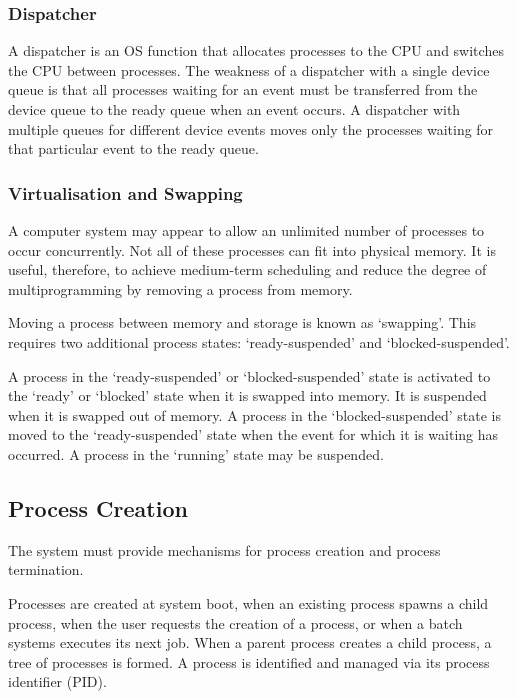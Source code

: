 \subsubsection{Dispatcher}

A dispatcher is an OS function that allocates processes to the CPU and switches the CPU between processes.
The weakness of a dispatcher with a single device queue is that all processes waiting for an event must be transferred from the device queue to the ready queue when an event occurs.
A dispatcher with multiple queues for different device events moves only the processes waiting for that particular event to the ready queue.

\subsubsection{Virtualisation and Swapping}

A computer system may appear to allow an unlimited number of processes to occur concurrently.
Not all of these processes can fit into physical memory.
It is useful, therefore, to achieve medium-term scheduling and reduce the degree of multiprogramming by removing a process from memory.

Moving a process between memory and storage is known as `swapping'.
This requires two additional process states: `ready-suspended' and `blocked-suspended'.

A process in the `ready-suspended' or `blocked-suspended' state is activated to the `ready' or `blocked' state when it is swapped into memory.
It is suspended when it is swapped out of memory.
A process in the `blocked-suspended' state is moved to the `ready-suspended' state when the event for which it is waiting has occurred.
A process in the `running' state may be suspended.

\subsection{Process Creation}

The system must provide mechanisms for process creation and process termination.

Processes are created at system boot, when an existing process spawns a child process, when the user requests the creation of a process, or when a batch systems executes its next job.
When a parent process creates a child process, a tree of processes is formed.
A process is identified and managed via its process identifier (PID).

